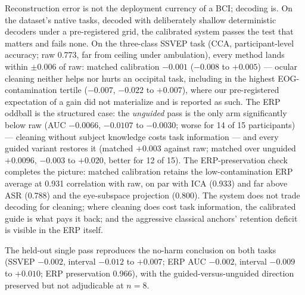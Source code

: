 Reconstruction error is not the deployment currency of a BCI; decoding is. On the dataset's native tasks, decoded with deliberately shallow deterministic decoders under a pre-registered grid, the calibrated system passes the test that matters and fails none. On the three-class SSVEP task (CCA, participant-level accuracy; raw 0.773, far from ceiling under ambulation), every method lands within $\pm 0.006$ of raw: matched calibration $-0.001$ ($-0.008$ to $+0.005$) --- ocular cleaning neither helps nor hurts an occipital task, including in the highest EOG-contamination tertile ($-0.007$, $-0.022$ to $+0.007$), where our pre-registered expectation of a gain did not materialize and is reported as such. The ERP oddball is the structured case: the \emph{unguided} pass is the only arm significantly below raw (AUC $-0.0066$, $-0.0107$ to $-0.0030$; worse for 14 of 15 participants) --- cleaning without subject knowledge costs task information --- and every guided variant restores it (matched $+0.003$ against raw; matched over unguided $+0.0096$, $-0.003$ to $+0.020$, better for 12 of 15). The ERP-preservation check completes the picture: matched calibration retains the low-contamination ERP average at 0.931 correlation with raw, on par with ICA (0.933) and far above ASR (0.788) and the eye-subspace projection (0.800). The system does not trade decoding for cleaning; where cleaning does cost task information, the calibrated guide is what pays it back; and the aggressive classical anchors' retention deficit is visible in the ERP itself.

The held-out single pass reproduces the no-harm conclusion on both tasks (SSVEP $-0.002$, interval $-0.012$ to $+0.007$; ERP AUC $-0.002$, interval $-0.009$ to $+0.010$; ERP preservation 0.966), with the guided-versus-unguided direction preserved but not adjudicable at $n=8$.

